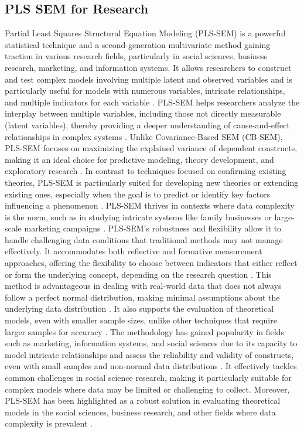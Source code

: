 \subsection{PLS SEM for Research}

Partial Least Squares Structural Equation Modeling (PLS-SEM) is a powerful statistical technique and a second-generation multivariate method gaining traction in various research fields, particularly in social sciences, business research, marketing, and information systems. It allows researchers to construct and test complex models involving multiple latent and observed variables and is particularly useful for models with numerous variables, intricate relationships, and multiple indicators for each variable \parencite{Sarstedt2017PartialModeling, Henseler2015AModeling}. PLS-SEM helps researchers analyze the interplay between multiple variables, including those not directly measurable (latent variables), thereby providing a deeper understanding of cause-and-effect relationships in complex systems \parencite{Sarstedt2017PartialModeling}. Unlike Covariance-Based SEM (CB-SEM), PLS-SEM focuses on maximizing the explained variance of dependent constructs, making it an ideal choice for predictive modeling, theory development, and exploratory research \parencite{Chin1998TheModeling} \parencite{Sarstedt2017PartialModeling}. In contrast to techniques focused on confirming existing theories, PLS-SEM is particularly suited for developing new theories or extending existing ones, especially when the goal is to predict or identify key factors influencing a phenomenon \parencite{Chin1998TheModeling}. PLS-SEM thrives in contexts where data complexity is the norm, such as in studying intricate systems like family businesses or large-scale marketing campaigns \parencite{Henseler2015AModeling}. PLS-SEM's robustness and flexibility allow it to handle challenging data conditions that traditional methods may not manage effectively. It accommodates both reflective and formative measurement approaches, offering the flexibility to choose between indicators that either reflect or form the underlying concept, depending on the research question \parencite{Chin1998TheModeling}. This method is advantageous in dealing with real-world data that does not always follow a perfect normal distribution, making minimal assumptions about the underlying data distribution \parencite{Lohmoller1989LatentSquares}. It also supports the evaluation of theoretical models, even with smaller sample sizes, unlike other techniques that require larger samples for accuracy \parencite{Sarstedt2017PartialModeling}. The methodology has gained popularity in fields such as marketing, information systems, and social sciences due to its capacity to model intricate relationships and assess the reliability and validity of constructs, even with small samples and non-normal data distributions \parencite{Chin1998TheModeling}. It effectively tackles common challenges in social science research, making it particularly suitable for complex models where data may be limited or challenging to collect. Moreover, PLS-SEM has been highlighted as a robust solution in evaluating theoretical models in the social sciences, business research, and other fields where data complexity is prevalent \parencite{Sarstedt2017PartialModeling}.

